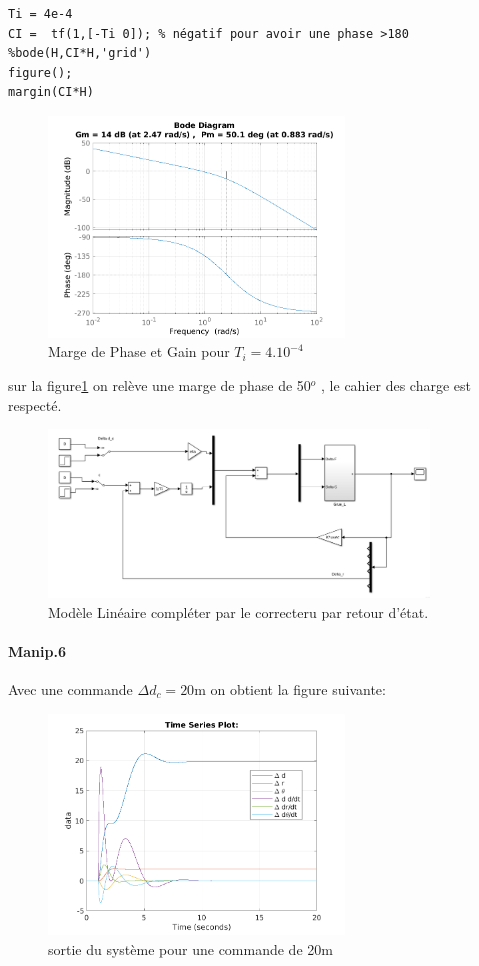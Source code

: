 \documentclass[10pt,a4paper,notitlepage]{article}
\begin{document}
\begin{verbatim}
Ti = 4e-4
CI =  tf(1,[-Ti 0]); % négatif pour avoir une phase >180
%bode(H,CI*H,'grid')
figure();
margin(CI*H)  
\end{verbatim}
\begin{figure}[H]
  \centering
  \includegraphics[width=0.7\textwidth]{manip_5marge.png}
  \caption{Marge de Phase et Gain pour $T_i=4.10^{-4}$}
  \label{fig:margin}
\end{figure}
sur la figure\ref{fig:margin} on relève une marge de phase de 50$^o$ , le cahier des charge est respecté.

\begin{figure}[ht]
  \centering
  \includegraphics[width=0.9\textwidth]{bouclage_modele_L.png}
  \caption{Modèle Linéaire compléter par le correcteru par retour d'état.}
  \label{fig:label}
\end{figure}

\paragraph{Manip.6}
Avec une commande $\Delta d_c = 20$m on obtient la figure suivante:
\begin{figure}[ht]
  \centering
  \includegraphics[width=0.7\textwidth]{manip6_20.png}
  \caption{sortie du système pour une commande de 20m}
  \label{fig:gain20}
\end{figure}
\end{document}
